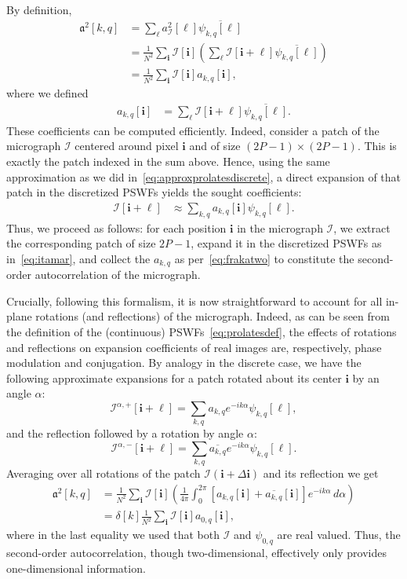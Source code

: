 \documentclass[english,11pt]{article}
\newcommand{\1}{\mathbf{1}}
\newcommand{\II}{\mathcal{I}}
\newcommand{\mb}{\mathbf}
\newcommand*\Bell{\ensuremath{\boldsymbol\ell}}
\numberwithin{equation}{section}
\theoremstyle{plain}
\theoremstyle{definition}
\theoremstyle{remark}
\theoremstyle{plain}
\theoremstyle{remark}
\theoremstyle{plain}
\theoremstyle{plain}
\begin{document}
By definition,
\begin{align}
\mathfrak{a}^2[k,q] & =\sum_{\Bell} a^2_\II[\Bell] \overline{\psi_{k,q}[\Bell]} \nonumber\\
	& = \frac{1}{N^2}\sum_{\mb i}\II[\mb i]\left(\sum_{\Bell}\II[\mb i+\Bell]\overline{\psi_{k,q}[\Bell]}\right) \nonumber \\
	& = \frac{1}{N^2}\sum_{\mb i}\II[\mb i] a_{k,q}[\mb i], \label{eq:frakatwo}
\end{align}
where we defined
\begin{align*}
	a_{k,q}[\mb i] & = \sum_{\Bell}\II[\mb i+\Bell]\overline{\psi_{k,q}[\Bell]}.
\end{align*}
These coefficients can be computed efficiently. Indeed, consider a patch of the micrograph $\II$ centered around pixel $\mb i$ and of size $(2P-1) \times (2P-1)$. This is exactly the patch indexed in the sum above. Hence, using the same approximation as we did in~\eqref{eq:approxprolatesdiscrete}, a direct expansion of that patch in the discretized PSWFs yields the sought coefficients:
\begin{align}
	\II[\mb i+\Bell] & \approx \sum_{k,q} a_{k,q}[\mb i] \psi_{k,q}[\Bell]. \label{eq:itamar}
\end{align}
Thus, we proceed as follows:
for each position $\mb i$ in the micrograph $\II$, we extract the corresponding patch of size $2P-1$, expand it in the discretized PSWFs as in~\eqref{eq:itamar}, and collect the $a_{k,q}$ as per~\eqref{eq:frakatwo} to constitute the second-order autocorrelation of the micrograph.

Crucially, following this formalism, it is now straightforward to account for all in-plane rotations (and reflections) of the micrograph. Indeed, as can be seen from the definition of the (continuous) PSWFs~\eqref{eq:prolatesdef}, the effects of rotations and reflections on expansion coefficients of real images are, respectively, phase modulation and conjugation. By analogy in the discrete case, we have the following approximate expansions for a patch rotated about its center $\mb i$ by an angle $\alpha$:
\[ \II^{\alpha,+}[\mb i+\Bell] = \sum_{k,q}a_{k,q}e^{-ik\alpha}\psi_{k,q}[\Bell],\]
and the reflection followed by a rotation by angle $\alpha$:
\[ \II^{\alpha,-}[\mb i+\Bell] = \sum_{k,q}\overline{a_{k,q}}e^{-ik\alpha}\psi_{k,q}[\Bell].\]
Averaging over all rotations of the patch $\II(\mb i + \Delta\mb i)$ and its reflection we get
\[\begin{aligned} 
\mathfrak{a}^2[k,q] &= \frac{1}{N^2}\sum_{\mb i}\II[\mb i]\left(\frac{1}{4\pi}\int_0^{2\pi}[a_{k,q}[\mb i] +
\overline{a_{k,q}}[\mb i]]e^{-ik\alpha}\, d\alpha\right)\\ 
&= \delta[k] \frac{1}{N^2}\sum_{\mb i}\II[\mb i]a_{0,q}[\mb i], \end{aligned}\]
where in the last equality we used that both $\II$ and $\psi_{0,q}$ are real valued.
Thus, the second-order autocorrelation, though two-dimensional, effectively only provides one-dimensional information.
\end{document}
